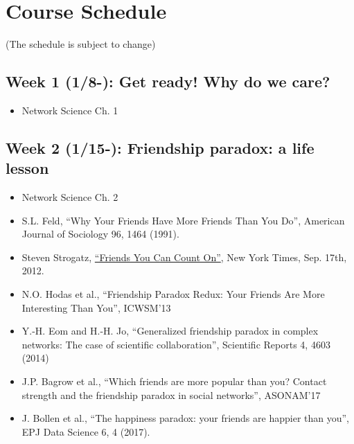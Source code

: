 \documentclass[11pt,article,oneside]{memoir} %
\begin{document}
\section{Course Schedule} %

(The schedule is subject to change)

\subsection{Week 1 (1/8-):  Get ready! Why do we care?}
\vspace{-0.2em}\begin{itemize}\itemsep0em
\item Network Science Ch. 1
\end{itemize}

\subsection{Week 2 (1/15-):  Friendship paradox: a life lesson}
\vspace{-0.2em}\begin{itemize}\itemsep0em
\item Network Science Ch. 2
\item S.L. Feld, ``Why Your Friends Have More Friends Than You Do'', American Journal of Sociology 96, 1464 (1991).
\item Steven Strogatz, \href{https://opinionator.blogs.nytimes.com/2012/09/17/friends-you-can-count-on/}{``Friends You Can Count On''}, New York Times, Sep. 17th, 2012.
\item N.O. Hodas et al., ``Friendship Paradox Redux: Your Friends Are More Interesting Than You'', ICWSM'13
\item Y.-H. Eom and H.-H. Jo, ``Generalized friendship paradox in complex networks: The case of scientific collaboration'', Scientific Reports 4, 4603 (2014)
\item J.P. Bagrow et al., ``Which friends are more popular than you? Contact strength and the friendship paradox in social networks'', ASONAM'17
\item J. Bollen et al., ``The happiness paradox: your friends are happier than you'', EPJ Data Science 6, 4 (2017).
\end{itemize}
\end{document}

